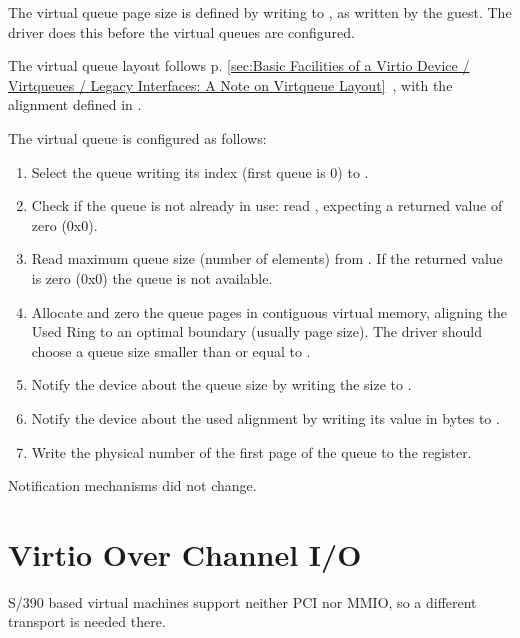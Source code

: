 The virtual queue page size is defined by writing to ,
as written by the guest. The driver does this before the
virtual queues are configured.

The virtual queue layout follows
p. \ref{sec:Basic Facilities of a Virtio Device / Virtqueues / Legacy Interfaces: A Note on Virtqueue Layout}~,
with the alignment defined in .

The virtual queue is configured as follows:
\begin{enumerate}
\item Select the queue writing its index (first queue is 0) to
   .

\item Check if the queue is not already in use: read ,
   expecting a returned value of zero (0x0).

\item Read maximum queue size (number of elements) from
   . If the returned value is zero (0x0) the
   queue is not available.

\item Allocate and zero the queue pages in contiguous virtual
   memory, aligning the Used Ring to an optimal boundary (usually
   page size). The driver should choose a queue size smaller than or
   equal to .

\item Notify the device about the queue size by writing the size to
   .

\item Notify the device about the used alignment by writing its value
   in bytes to .

\item Write the physical number of the first page of the queue to
   the  register.
\end{enumerate}

Notification mechanisms did not change.

\section{Virtio Over Channel I/O}\label{sec:Virtio Transport Options / Virtio Over Channel I/O}

S/390 based virtual machines support neither PCI nor MMIO, so a
different transport is needed there.

